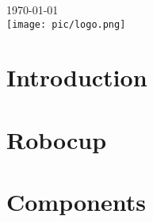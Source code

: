 \documentclass[12pt]{report}
\begin{document}
\begin{titlepage}


{\large \today}\\[2cm] %


\texttt{[image: pic/logo.png]}\\[1cm] %
 

\vfill %

\end{titlepage}

\tableofcontents
\listoffigures
\listoftables


\begin{abstract}
	
\end{abstract}

\chapter{Introduction}
	

\chapter{Robocup}
	

\chapter{Components}
\end{document}
